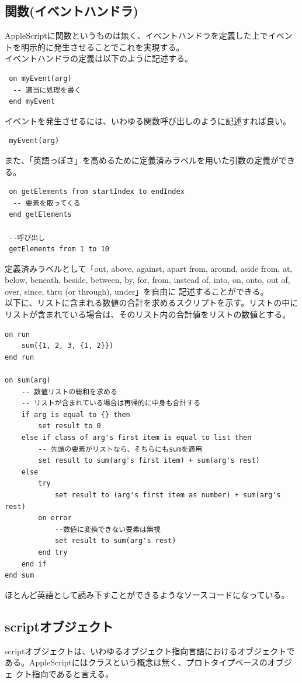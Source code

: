 \documentclass[a4paper,7pt]{jsarticle}
\begin{document}
\subsection{関数(イベントハンドラ)}
AppleScriptに関数というものは無く、イベントハンドラを定義した上でイベン
トを明示的に発生させることでこれを実現する。\\

イベントハンドラの定義は以下のように記述する。
\begin{lstlisting}
 on myEvent(arg)
  -- 適当に処理を書く
 end myEvent
\end{lstlisting}
イベントを発生させるには、いわゆる関数呼び出しのように記述すれば良い。
\begin{lstlisting}
 myEvent(arg)
\end{lstlisting}
また、「英語っぽさ」を高めるために定義済みラベルを用いた引数の定義ができる。
\begin{lstlisting}
 on getElements from startIndex to endIndex
  -- 要素を取ってくる
 end getElements

 --呼び出し
 getElements from 1 to 10 
\end{lstlisting}
定義済みラベルとして「out, above, against, apart from, around, aside
from, at, below, beneath, beside, between, by, for, from, instead of,
into, on, onto, out of, over, since, thru (or through), under」を自由に
記述することができる。\\
\newpage
以下に、リストに含まれる数値の合計を求めるスクリプトを示す。リストの中に
リストが含まれている場合は、そのリスト内の合計値をリストの数値とする。

\begin{lstlisting}
on run
	sum({1, 2, 3, {1, 2}})
end run

on sum(arg)
	-- 数値リストの総和を求める
	-- リストが含まれている場合は再帰的に中身も合計する
	if arg is equal to {} then
		set result to 0
	else if class of arg's first item is equal to list then
		-- 先頭の要素がリストなら、そちらにもsumを適用
		set result to sum(arg's first item) + sum(arg's rest)
	else
		try
			set result to (arg's first item as number) + sum(arg's rest)
		on error
			--数値に変換できない要素は無視
			set result to sum(arg's rest)
		end try
	end if
end sum
\end{lstlisting}
ほとんど英語として読み下すことができるようなソースコードになっている。


\subsection{scriptオブジェクト}
scriptオブジェクトは、いわゆるオブジェクト指向言語におけるオブジェクトで
ある。AppleScriptにはクラスという概念は無く、プロトタイプベースのオブジェ
クト指向であると言える。
\end{document}
